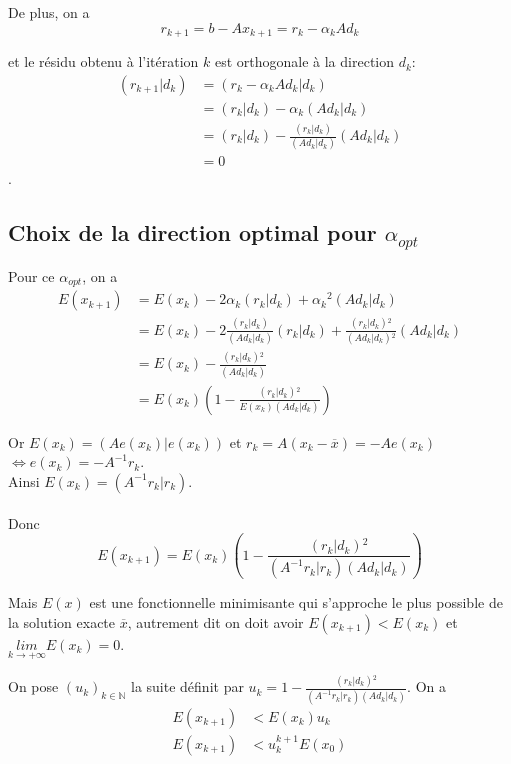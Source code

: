\documentclass[french]{article}
\begin{document}
De plus, on a 
\begin{equation}
r_{k+1}=b-Ax_{k+1}=r_{k}-\alpha_{k}Ad_{k}
\end{equation}

et le résidu obtenu à l'itération $k$ est orthogonale à la direction
$d_{k}$: 
\begin{align}
(r_{k+1}|d_{k}) & =(r_{k}-\alpha_{k}Ad_{k}|d_{k})\nonumber \\
 & =(r_{k}|d_{k})-\alpha_{k}(Ad_{k}|d_{k})\nonumber \\
 & =(r_{k}|d_{k})-\frac{(r_{k}|d_{k})}{(Ad_{k}|d_{k})}(Ad_{k}|d_{k})\\
 & =0\nonumber 
\end{align}
. 

\subsection{Choix de la direction optimal pour $\alpha_{opt}$}

Pour ce $\alpha_{opt}$, on a 
\begin{align*}
E(x_{k+1}) & =E(x_{k})-2\alpha_{k}(r_{k}|d_{k})+\alpha_{k}{{}^2}(Ad_{k}|d_{k})\\
 & =E(x_{k})-2\frac{(r_{k}|d_{k})}{(Ad_{k}|d_{k})}(r_{k}|d_{k})+\frac{(r_{k}|d_{k}){{}^2}}{(Ad_{k}|d_{k}){{}^2}}(Ad_{k}|d_{k})\\
 & =E(x_{k})-\frac{(r_{k}|d_{k}){{}^2}}{(Ad_{k}|d_{k})}\\
 & =E(x_{k})(1-\frac{(r_{k}|d_{k}){{}^2}}{E(x_{k})(Ad_{k}|d_{k})})
\end{align*}

Or $E(x_{k})=(Ae(x_{k})|e(x_{k}))$ et $r_{k}=A(x_{k}-\overline{x})=-Ae(x_{k})$$\iff e(x_{k})=-A^{-1}r_{k}$.
\\
Ainsi $E(x_{k})=(A^{-1}r_{k}|r_{k})$.\\
\\

Donc 
\begin{equation}
E(x_{k+1})=E(x_{k})(1-\frac{(r_{k}|d_{k}){{}^2}}{(A^{-1}r_{k}|r_{k})(Ad_{k}|d_{k})})
\end{equation}

Mais $E(x)$ est une fonctionnelle minimisante qui s'approche le plus
possible de la solution exacte $\overline{x}$, autrement dit on doit
avoir $E(x_{k+1})<E(x_{k})$ et $\underset{k\rightarrow+\infty}{lim}E(x_{k})=0$.

On pose $(u_{k})_{k\in\mathbb{N}}$ la suite définit par $u_{k}=$$1-\frac{(r_{k}|d_{k}){{}^2}}{(A^{-1}r_{k}|r_{k})(Ad_{k}|d_{k})}$.
On a 
\begin{align*}
E(x_{k+1}) & <E(x_{k})u_{k}\\
E(x_{k+1}) & <u_{k}^{k+1}E(x_{0})
\end{align*}
\end{document}
